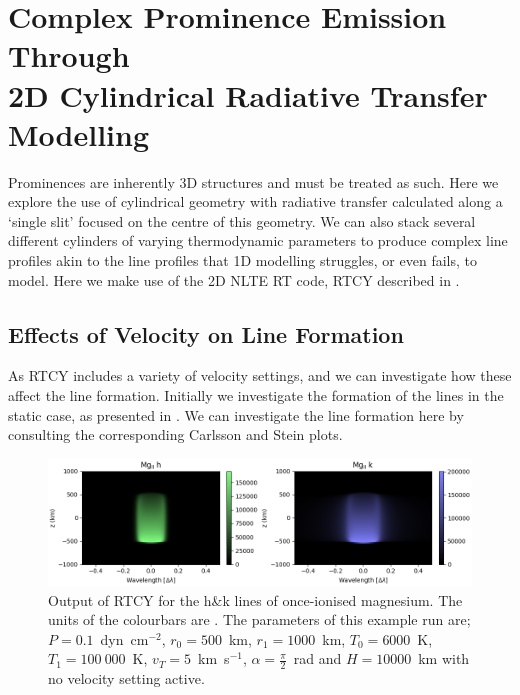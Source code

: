 \chapter{Complex Prominence Emission Through\\2D Cylindrical Radiative Transfer Modelling}\label{Chap:2DModel}

Prominences are inherently 3D structures and must be treated as such. Here we explore the use of cylindrical geometry with radiative transfer calculated along a `single slit' focused on the centre of this geometry. We can also stack several different cylinders of varying thermodynamic parameters to produce complex line profiles akin to the line profiles that 1D modelling struggles, or even fails, to model. Here we make use of the 2D NLTE RT code, RTCY described in .



\section{Effects of Velocity on Line Formation}
As RTCY includes a variety of velocity settings, and we can investigate how these affect the line formation. Initially we investigate the formation of the lines in the static case, as presented in . We can investigate the line formation here by consulting the corresponding Carlsson and Stein plots.

\begin{figure}
    \centering
    \includegraphics[width=\linewidth]{./03Modelling2D/figs/exmg.png}
    \caption[Output of RTCY for the h\&k lines of once-ionised magnesium.]{Output of RTCY for the h\&k lines of once-ionised magnesium. The units of the colourbars are \cgsint. The parameters of this example run are; $P=0.1$~dyn~cm$^{-2}$, $r_0=500$~km, $r_1=1000$~km, $T_0=6000$~K, $T_1=100~000$~K, $v_T=5$~km~s$^{-1}$, $\alpha=\frac{\pi}{2}$~rad and $H=10000$~km with no velocity setting active.}
    \label{fig:exhmg}
\end{figure}

